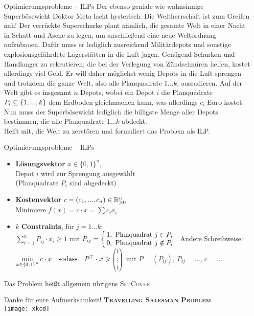 \begin{frame}{Optimierungsprobleme – ILPs}
	\vspace{-.3\baselineskip}
	Der ebenso geniale wie wahnsinnige Superbösewicht Doktor Meta lacht hysterisch: Die Weltherrschaft ist zum Greifen nah! Der verrückte Superschurke plant nämlich, die gesamte Welt in einer Nacht in Schutt und Asche zu legen, um anschließend eine neue Weltordnung aufzubauen. Dafür muss er lediglich ausreichend Militärdepots und sonstige explosionsgefährdete Lagerstätten in die Luft jagen. Genügend Schurken und Handlanger zu rekrutieren, die bei der Verlegung von Zündschnüren helfen, kostet allerdings viel Geld. Er will daher möglichst wenig Depots in die Luft sprengen und trotzdem die ganze Welt, also alle Planquadrate $1...k$, ausradieren. Auf der Welt gibt es insgesamt $n$ Depots, wobei ein Depot $i$ die Planquadrate $P_i \subseteq \left\{1,...,k\right\}$ dem Erdboden gleichmachen kann, was allerdings $c_i$ Euro kostet. Nun muss der Superbösewicht lediglich die billigste Menge aller Depots bestimmen, die alle Planquadrate $1...k$ abdeckt.  \\
	Helft mit, die Welt zu zerstören und formuliert das Problem als ILP.
\end{frame}

\begin{frame}{Optimierungsprobleme – ILPs}
	\solutionheading
	\begin{itemize}
		\item \textbf{Lösungsvektor} $x \in \{0, 1\}^n$, \\ 
		Depot $i$ wird zur Sprengung ausgewählt  \\
		\. (\entspr Planquadrate $P_i$ sind abgedeckt)
		\item \textbf{Kostenvektor} $c = (c_1, ..., c_n) \in \mathbb{R}_{\geqslant0}^n$ \\
		\quad Minimiere $f(x) = c \cdot x = \sum c_i x_i$
		\item $k$ \textbf{Constraints}, \quad für $j = 1...k$: \\
		\quad $\sum\limits_{i=1}^{n} P_{ij} \cdot x_i  \geq 1$ \quad mit $P_{ij} = \casesl{1, \ \text{Planquadrat } j \in P_i \\ 0, \ \text{Planquadrat } j \notin P_i}$
		\implitem Andere Schreibweise: \\
			$\min\limits_{x \in \set{0,1}^n} c \* x \quad \text{sodass} \quad P^\top \* x \geq \scalebox{.7}{$\large \Matrix{1 \\ \vdots \\ 1}$}$\!\! \quad\! mit $P = (P_{ij})$, $P_{ij} = ...$, $c = ...$ 
	\end{itemize}
	Das Problem heißt allgemein übrigens \textsc{SetCover}.
\end{frame}

\begin{frame}{Danke für eure Aufmerksamkeit! \smiley}
	\centering
	\textbf{\textsc{Travelling Salesman Problem}} \\[.2\baselineskip]
	\texttt{[image: xkcd]}
\end{frame}


